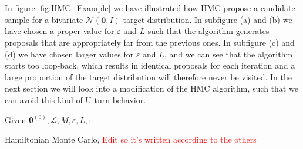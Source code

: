 \\
\\
In figure \ref{fig:HMC_Example} we have illustrated how HMC propose a candidate sample for a bivariate $\mathcal{N}\left(\mathbf{0},\mathit{I}\right)$ target distribution. In subfigure (a) and (b) we have chosen a proper value for $\varepsilon$ and $L$ such that the algorithm generates proposals that are appropriately far from the previous ones. In subfigure (c) and (d) we have chosen larger values for $\varepsilon$ and $L$, and we can see that the algorithm starts too loop-back, which results in identical proposals for each iteration and a large proportion of the target distribution will therefore never be visited. In the next section we will look into a modification of the HMC algorithm, such that we can avoid this kind of U-turn behavior.  


\begin{algorithm}\label{alg:HMC}
\SetAlgoLined
{}
$\text{Given } \boldsymbol{\theta}^{(0)},  \mathcal{L}, M, \varepsilon, L,$:\\
\caption{Hamiltonian Monte Carlo, \textcolor{red}{Edit so it's written according to the others}}
\end{algorithm}


